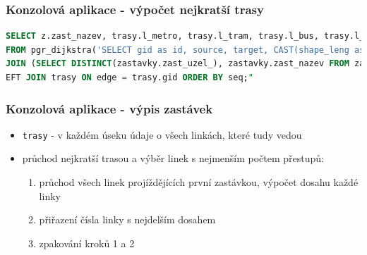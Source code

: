 \documentclass{beamer}
\begin{document}
\begin{frame}[fragile]
\frametitle{Konzolová aplikace - výpočet nejkratší trasy}
\begin{exampleblock}{}
\begin{lstlisting}[language=sql]
SELECT z.zast_nazev, trasy.l_metro, trasy.l_tram, trasy.l_bus, trasy.l_lan, trasy.l_vlak, trasy.l_lod, node
FROM pgr_dijkstra('SELECT gid as id, source, target, CAST(shape_leng as REAL) as cost FROM trasy', id_from, id_to) 
JOIN (SELECT DISTINCT(zastavky.zast_uzel_), zastavky.zast_nazev FROM zastavky) AS z ON node = z.zast_uzel_ L
EFT JOIN trasy ON edge = trasy.gid ORDER BY seq;"
\end{lstlisting}
\end{exampleblock}
\end{frame}

\begin{frame}
\frametitle{Konzolová aplikace - výpis zastávek}
\begin{itemize}
	\item \texttt{trasy} - v každém úseku údaje o všech linkách, které tudy vedou
	\item průchod nejkratší trasou a výběr linek s nejmenším počtem přestupů: 
	\begin{enumerate}
		\item průchod všech linek projíždějících první zastávkou, výpočet dosahu každé linky
	\item přiřazení čísla linky s nejdelším dosahem
	\item zpakování kroků 1 a 2
	\end{enumerate}
\end{itemize}
\end{frame}
\end{document}
